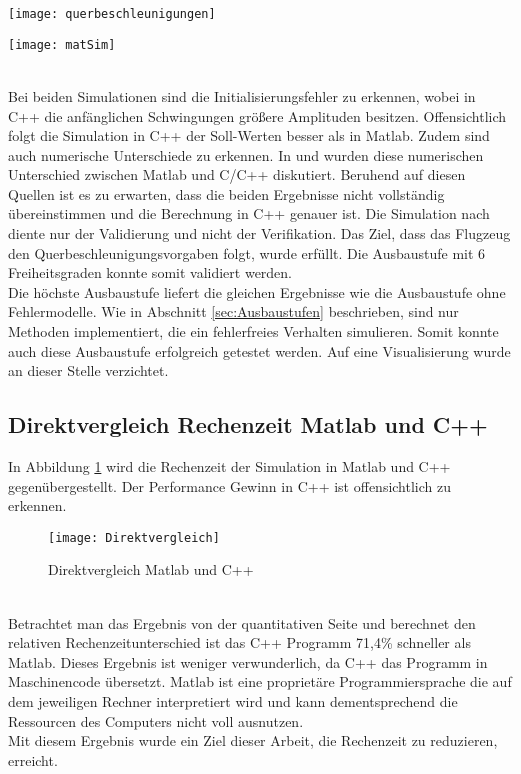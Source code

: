  \begin{minipage}{0.49\linewidth} 	
 		\texttt{[image: querbeschleunigungen]}
 \end{minipage}
 \begin{minipage}{0.01\linewidth}
	\hfill
\end{minipage}
 \begin{minipage}{0.49\linewidth}
		\texttt{[image: matSim]}
\end{minipage}
\noindent\\
Bei beiden Simulationen sind die Initialisierungsfehler zu erkennen, wobei in C++ die anfänglichen Schwingungen größere Amplituden besitzen. Offensichtlich folgt die Simulation in C++ der Soll-Werten besser als in Matlab. Zudem sind auch numerische Unterschiede zu erkennen. In \cite{Unbekannt.2012} und \cite{Unbekannt.2011} wurden diese numerischen Unterschied zwischen Matlab und C/C++ diskutiert. Beruhend auf diesen Quellen ist es zu erwarten, dass die beiden Ergebnisse nicht vollständig übereinstimmen und die Berechnung in C++ genauer ist. Die Simulation nach \cite{Olucak.15.02.2017} diente nur der Validierung und nicht der Verifikation. Das Ziel, dass das Flugzeug den Querbeschleunigungsvorgaben folgt, wurde erfüllt. Die Ausbaustufe mit 6 Freiheitsgraden konnte somit validiert werden.\\ Die höchste Ausbaustufe liefert die gleichen Ergebnisse wie die Ausbaustufe ohne Fehlermodelle. Wie in Abschnitt \ref{sec:Ausbaustufen} beschrieben, sind nur Methoden implementiert, die ein fehlerfreies Verhalten simulieren. Somit konnte auch diese Ausbaustufe erfolgreich getestet werden. Auf eine Visualisierung wurde an dieser Stelle verzichtet.
\newpage
\subsection{Direktvergleich Rechenzeit Matlab und C++}
In Abbildung \ref{fig:direktvergleich} wird die Rechenzeit der Simulation in Matlab und C++ gegenübergestellt. Der Performance Gewinn in C++ ist offensichtlich zu erkennen.
\begin{figure}[h]
	\centering
	\texttt{[image: Direktvergleich]}
	\caption{Direktvergleich Matlab und C++}
	\label{fig:direktvergleich}
\end{figure}\noindent \\
Betrachtet man das Ergebnis von der quantitativen Seite und berechnet den relativen Rechenzeitunterschied ist das C++ Programm 71,4\% schneller als Matlab. Dieses Ergebnis ist weniger verwunderlich, da C++ das Programm in Maschinencode übersetzt. Matlab ist eine proprietäre Programmiersprache die auf dem jeweiligen Rechner interpretiert wird und kann dementsprechend die Ressourcen des Computers nicht voll ausnutzen.\\
Mit diesem Ergebnis wurde ein Ziel dieser Arbeit, die Rechenzeit zu reduzieren, erreicht.
